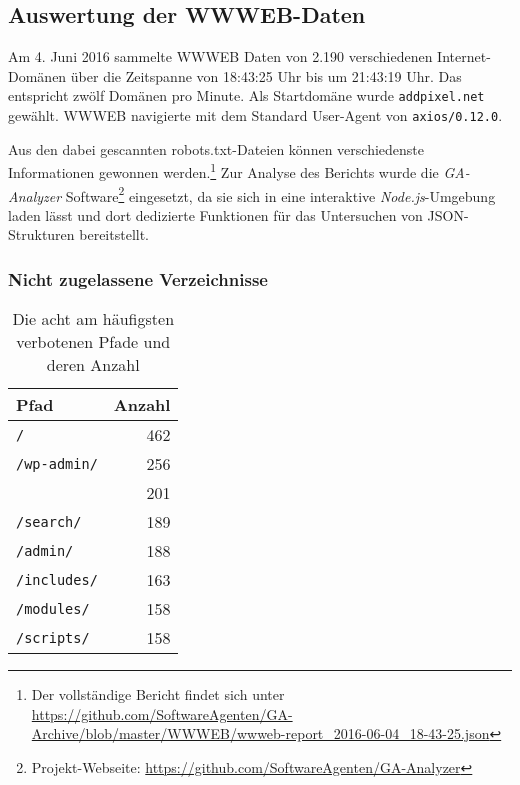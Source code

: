 \subsection{Auswertung der WWWEB-Daten}
\label{sub:auswertung-der-wwweb-daten}

Am 4. Juni 2016 sammelte WWWEB Daten von 2.190 verschiedenen Internet-Domänen
über die Zeitspanne von 18:43:25 Uhr bis um 21:43:19 Uhr. Das entspricht zwölf
Domänen pro Minute. Als Startdomäne wurde \texttt{addpixel.net} gewählt. WWWEB
navigierte mit dem Standard User-Agent von \texttt{axios/0.12.0}.

Aus den dabei gescannten robots.txt-Dateien können verschiedenste Informationen
gewonnen werden.\footnote{Der vollständige Bericht findet sich unter
\url{https://github.com/SoftwareAgenten/GA-Archive/blob/master/WWWEB/wwweb-report_2016-06-04_18-43-25.json}} Zur Analyse des Berichts wurde die
\emph{GA-Analyzer} Software\footnote{Projekt-Webseite:
\url{https://github.com/SoftwareAgenten/GA-Analyzer}} eingesetzt, da sie sich
in eine interaktive \emph{Node.js}-Umgebung laden lässt und dort dedizierte
Funktionen für das Untersuchen von JSON-Strukturen bereitstellt.

\subsubsection{Nicht zugelassene Verzeichnisse}
\label{ssub:nicht-zugelassene-verzeichnisse}

\begin{table}[h]
  \begin{tabular}{ l|r }
    \textbf{Pfad} & \textbf{Anzahl}\\
    \hline
    \texttt{/}          & 462 \\
    \texttt{/wp-admin/} & 256 \\
                        & 201 \\
    \texttt{/search/}   & 189 \\
    \texttt{/admin/}    & 188 \\
    \texttt{/includes/} & 163 \\
    \texttt{/modules/}  & 158 \\
    \texttt{/scripts/}  & 158 \\
  \end{tabular}
  
  \caption{Die acht am häufigsten verbotenen Pfade und deren Anzahl}
  \label{tab:maxBlockedDirs}
\end{table}

